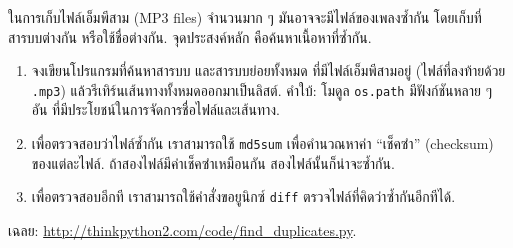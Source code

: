 \begin{exercise}
\label{checksum}


ในการเก็บไฟล์เอ็มพีสาม (MP3 files) จำนวนมาก ๆ
มันอาจจะมีไฟล์ของเพลงซ้ำกัน โดยเก็บที่สารบบต่างกัน หรือใช้ชื่อต่างกัน.
จุดประสงค์หลัก คือค้นหาเนื้อหาที่ซ้ำกัน.

\begin{enumerate}


\item จงเขียนโปรแกรมที่ค้นหาสารบบ และสารบบย่อยทั้งหมด
ที่มีไฟล์เอ็มพีสามอยู่ 
(ไฟล์ที่ลงท้ายด้วย \texttt{.mp3})
แล้วรีเทิร์นเส้นทางทั้งหมดออกมาเป็นลิสต์.
คำใบ้: โมดูล \texttt{os.path} มีฟังก์ชันหลาย ๆ อัน 
ที่มีประโยชน์ในการจัดการชื่อไฟล์และเส้นทาง.



\item เพื่อตรวจสอบว่าไฟล์ซ้ำกัน
เราสามารถใช้ \texttt{md5sum} เพื่อคำนวณหาค่า ``เช็คซำ'' (checksum) ของแต่ละไฟล์. 
ถ้าสองไฟล์มีค่าเช็คซำเหมือนกัน สองไฟล์นั้นก็น่าจะซ้ำกัน.



\item เพื่อตรวจสอบอีกที เราสามารถใช้คำสั่งขอยูนิกซ์ \texttt{diff} ตรวจไฟล์ที่คิดว่าซ้ำกันอีกทีได้.

\end{enumerate}


เฉลย: \url{http://thinkpython2.com/code/find_duplicates.py}.


\end{exercise}
\vspace{0.5cm}

